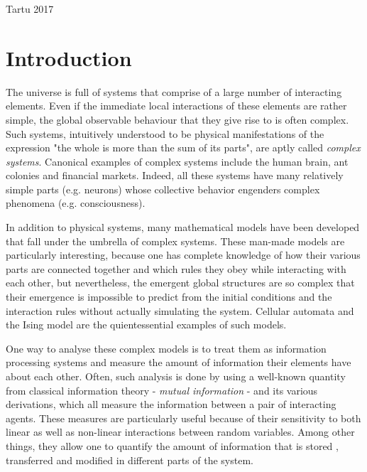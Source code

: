 \documentclass[12pt]{article}
\begin{document}
\vfill
\centerline{Tartu 2017}



\newpage
\tableofcontents

\newpage
\section*{Introduction}



The universe is full of systems that comprise of a large number of interacting elements. Even if the immediate local interactions of these elements are rather simple, the global observable behaviour that they give rise to is often complex. Such systems, intuitively understood to be physical manifestations of the expression "the whole is more than the sum of its parts", are aptly called \textit{complex systems}. Canonical examples of complex systems include the human brain, ant colonies and financial markets. Indeed, all these systems have many relatively simple parts (e.g. neurons) whose collective behavior engenders complex phenomena (e.g. consciousness). 

In addition to physical systems, many mathematical models have been developed that fall under the umbrella of complex systems. These man-made models are particularly interesting, because one has complete knowledge of how their various parts are connected together and which rules they obey while interacting with each other, but nevertheless, the emergent global structures are so complex that their emergence is impossible to predict from the initial conditions and the interaction rules without actually simulating the system.  Cellular automata and the Ising model are the quientessential examples of such models.

One way to analyse these complex models is to treat them as information processing systems and measure the amount of information their elements have about each other. Often, such analysis is done by using a well-known quantity from classical information theory - \textit{mutual information} - and its various derivations, which all measure the information between a pair of interacting agents. These measures are particularly useful because of their sensitivity to both linear as well as non-linear interactions between random variables. Among other things, they allow one to quantify the amount of information that is stored \cite{active-inf-storage}, transferred \cite{transfer-entropy} and modified \cite{inf-modification} in different parts of the system.
\end{document}
